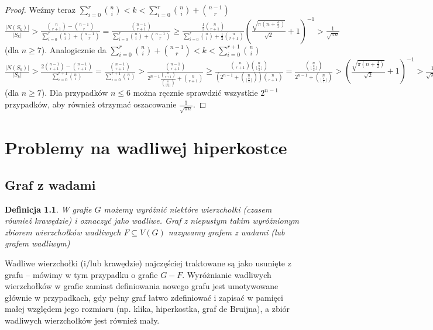 \documentclass{pracamgr}
\newtheorem{defi}{Definicja}[section]
\begin{document}
\begin{proof}
    Weźmy teraz $\sum_{i=0}^{r}{n\choose i}<k<\sum_{i=0}^{r}{n\choose i}+{n-1 \choose r}$\newline
    $\frac{|N(S_k)|}{|S_k|}>\frac{{n\choose r+1}-{n-1\choose r}}{\sum_{i=0}^{r}{n\choose i}+{n-1 \choose r}}=
    \frac{{n-1\choose r+1}}{\sum_{i=0}^{r}{n\choose i}+{n-1 \choose r}}\ge
    \frac{\frac{1}{2}{n \choose r+1}}{\sum_{i=0}^{r}{n\choose i}+\frac{1}{2}{n \choose r+1}}
    \left(\frac{\sqrt{\pi (n+\frac{3}{2})}}{\sqrt{2}}+1\right)^{-1}>\frac{1}{\sqrt{\pi n}}$ (dla $n\ge 7$).\newline
    Analogicznie da $\sum_{i=0}^{r}{n\choose i}+{n-1 \choose r}<k<\sum_{i=0}^{r+1}{n\choose i}$\newline
    $\frac{|N(S_k)|}{|S_k|}>\frac{2{n-1\choose r+1}-{n-1\choose r+1}}{\sum_{i=0}^{r+1}{n\choose i}}=
    \frac{{n-1\choose r+1}}{\sum_{i=0}^{r+1}{n\choose i}}>
    \frac{{n-1\choose r+1}}{2^{n-1}\frac{{n\choose r+1}}{{n\choose\lfloor\frac{n}{2}\rfloor}}+{n\choose r+1}}\ge
    \frac{{n\choose r+1}{n\choose\lfloor\frac{n}{2}\rfloor}}{(2^{n-1}+{n\choose\lfloor\frac{n}{2}\rfloor}){n\choose r+1}}=
    \frac{{n\choose\lfloor\frac{n}{2}\rfloor}}{2^{n-1}+{n\choose\lfloor\frac{n}{2}\rfloor}}>
    \left(\frac{\sqrt{\pi (n+\frac{3}{2})}}{\sqrt{2}}+1\right)^{-1}>\frac{1}{\sqrt{\pi n}}$ (dla $n\ge 7$).\newline
    Dla przypadków $n\le6$ można ręcznie sprawdzić wszystkie $2^{n-1}$ przypadków, aby również otrzymać oszacowanie $\frac{1}{\sqrt{\pi n}}$.
   \end{proof}
 \chapter{Problemy na wadliwej hiperkostce}
  \section{Graf z wadami}
   \begin{defi}\label{graf z wadami}
    W grafie $G$ możemy wyróżnić niektóre wierzchołki (czasem również krawędzie) i oznaczyć jako wadliwe.
    Graf z niepustym takim wyróżnionym zbiorem wierzchołków wadliwych $F\subseteq V(G)$ nazywamy \emph{grafem z wadami} (lub \emph{grafem wadliwym})
   \end{defi}%
    Wadliwe wierzchołki (i/lub krawędzie) najczęściej traktowane są jako usunięte z grafu -- mówimy w tym przypadku o grafie $G-F$.
    Wyróżnianie wadliwych wierzchołków w grafie zamiast definiowania nowego grafu jest umotywowane głównie w przypadkach,
    gdy pełny graf łatwo zdefiniować i zapisać w pamięci małej względem jego rozmiaru (np. klika, hiperkostka, graf de Bruijna),
    a zbiór wadliwych wierzchołków jest również mały.
\end{document}
